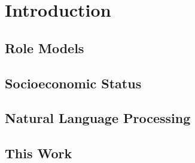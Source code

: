 \renewcommand{\imagepath}{../10-intro/img}

\chapter{Introduction}

\section{Role Models}

\section{Socioeconomic Status}

\section{Natural Language Processing}

\section{This Work}


